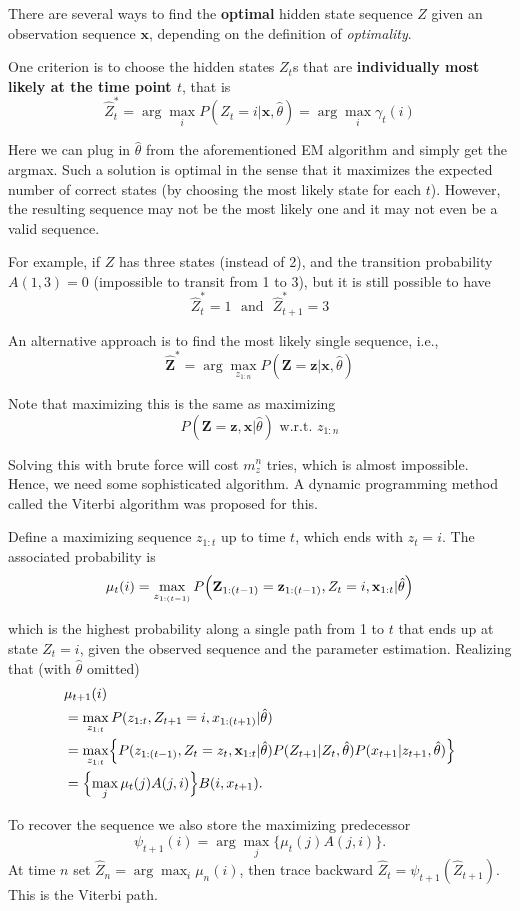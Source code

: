 \documentclass[
]{book}
\begin{document}
There are several ways to find the \textbf{optimal} hidden state sequence \(Z\) given an observation sequence \(\mathbf{x}\), depending on the definition of \emph{optimality}.

One criterion is to choose the hidden states \(Z_t\)s that are \textbf{individually most likely at the time point \(t\)}, that is
\[\hat{Z}_t^* = \arg \max_i P(Z_t=i | \mathbf{x}, \hat{\theta}) = \arg \max_i \gamma_t(i)\]

Here we can plug in \(\hat{\theta}\) from the aforementioned EM algorithm
and simply get the argmax. Such a solution is optimal in the sense that it maximizes the expected number of correct states (by choosing the most likely state for each \(t\)). However, the resulting sequence may not be the most likely one and it may not even be a valid sequence.

For example, if \(Z\) has three states (instead of 2), and the transition probability \(A(1, 3) = 0\) (impossible to transit from 1 to 3), but it is still possible to have
\[\hat{Z}_t^* = 1\,\, \text{ and } \,\,  \hat{Z}_{t+1}^* = 3\]

An alternative approach is to find the most likely single sequence, i.e.,
\[\hat{\mathbf{Z}}^* = \arg \max_{z_{1:n}} P(\mathbf{Z}=\mathbf{z}|\mathbf{x}, \hat{\theta})\]

Note that maximizing this is the same as maximizing
\[P(\mathbf{Z} = \mathbf{z}, \mathbf{x} | \hat{\theta}) \text{ w.r.t. } z_{1:n}\]

Solving this with brute force will cost \(m_z^n\) tries, which is almost impossible. Hence, we need some sophisticated algorithm. A dynamic programming method called the Viterbi
algorithm was proposed for this.

Define a maximizing sequence \(z_{1:t}\) up to time \(t\), which ends with
\(z_t = i\). The associated probability is
\[\mu_t(i) = \max_{z_{1:(t-1)}} P \Bigl(\mathbf{Z}_{1:(t-1)} = \mathbf{z}_{1:(t-1)}, Z_t = i, \mathbf{x}_{1:t} | \hat{\theta} \Bigr)\]

which is the highest probability along a single path from 1 to \(t\)
that ends up at state \(Z_t = i\), given the observed sequence and
the parameter estimation. Realizing that (with \(\hat{\theta}\) omitted)
\begin{align*}
&\mu_{t+1}(i) \\
&= \max_{z_{1:t}} P( z_{1:t}, Z_{t+1} = i, x_{1:(t+1)} | \hat{\theta})\\
&= \max_{z_{1:t}}\Bigl\{ P( z_{1:(t-1)}, Z_{t} = z_t, \mathbf{x}_{1:t} | \hat{\theta}) P(Z_{t+1}|Z_t, \hat{\theta}) P(x_{t+1}|z_{t+1}, \hat{\theta}) \Bigr\}\\
&= \Bigl\{ \max_j \mu_t(j) A(j,i) \Bigr\} B(i, x_{t+1}).
\end{align*}

To recover the sequence we also store the maximizing predecessor
\[\psi_{t+1}(i) = \arg\max_j \bigl\{\mu_t(j) A(j,i)\bigr\}.\]
At time \(n\) set \(\hat{Z}_n = \arg\max_i \mu_n(i)\), then trace backward \(\hat{Z}_t = \psi_{t+1}(\hat{Z}_{t+1})\). This is the Viterbi path.


\end{document}

